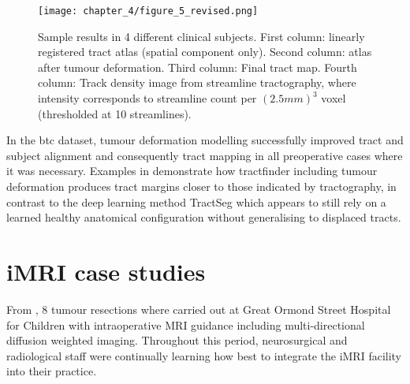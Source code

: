 \begin{figure*}[h!]
  \centering
  \texttt{[image: chapter\_4/figure\_5\_revised.png]}
  \caption{Sample results in 4 different clinical subjects. First column: linearly registered tract atlas (spatial component only). Second column: atlas after tumour deformation. Third column: Final tract map. Fourth column: Track density image from streamline tractography, where intensity corresponds to streamline count per $(2.5mm)^3$ voxel (thresholded at 10 streamlines).}
  \label{fig:res}
\end{figure*}

In the \gls{btc} dataset, tumour deformation modelling successfully improved tract and subject alignment and consequently tract mapping in all preoperative cases where it was necessary.
Examples in  demonstrate how tractfinder including tumour deformation produces tract margins closer to those indicated by tractography, in contrast to the deep learning method TractSeg which appears to still rely on a learned healthy anatomical configuration without generalising to displaced tracts.

\section{iMRI case studies}

From , 8  tumour resections where carried out at Great Ormond Street Hospital for Children with intraoperative MRI guidance including multi-directional diffusion weighted imaging.
Throughout this period, neurosurgical and radiological staff were continually learning how best to integrate the iMRI facility into their practice.

